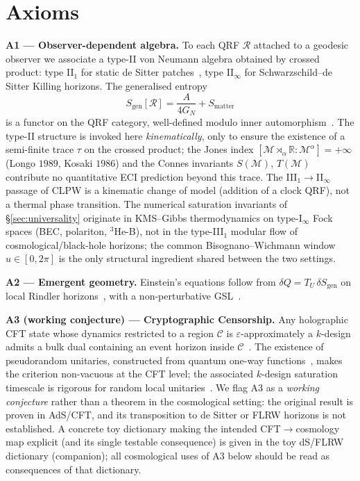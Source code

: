 \documentclass[reprint,amsmath,amssymb,aps,prd,superscriptaddress]{revtex4-2}
\providecommand{\1}{\mathbf{1}}
\begin{document}
\maketitle

\section{Axioms}

\noindent\textbf{A1 --- Observer-dependent algebra.}
To each QRF $\mathcal{R}$ attached to a geodesic observer we associate a type-II von Neumann algebra obtained by crossed product: type II$_1$ for static de Sitter patches~\cite{CLPW2023}, type II$_\infty$ for Schwarzschild--de Sitter Killing horizons. The generalised entropy
\begin{equation}
S_{\mathrm{gen}}[\mathcal{R}] = \frac{A}{4 G_N} + S_{\mathrm{matter}}
\end{equation}
is a functor on the QRF category, well-defined modulo inner automorphism~\cite{DEHK2025a,DEHK2025b,TiettoVerlinde2025}. The type-II structure is invoked here \emph{kinematically}, only to ensure the existence of a semi-finite trace $\tau$ on the crossed product; the Jones index $[\mathcal{M}\rtimes_\alpha\mathbb{R}:\mathcal{M}^\alpha]=+\infty$ (Longo $1989$, Kosaki $1986$) and the Connes invariants $S(\mathcal{M})$, $T(\mathcal{M})$ contribute no quantitative ECI prediction beyond this trace. The III$_1\!\to$II$_\infty$ passage of CLPW is a kinematic change of model (addition of a clock QRF), not a thermal phase transition. The numerical saturation invariants of \S\ref{sec:universality} originate in KMS--Gibbs thermodynamics on type-I$_\infty$ Fock spaces (BEC, polariton, $^3$He-B), not in the type-III$_1$ modular flow of cosmological/black-hole horizons; the common Bisognano--Wichmann window $u\in[0,2\pi]$ is the only structural ingredient shared between the two settings.

\smallskip
\noindent\textbf{A2 --- Emergent geometry.}
Einstein's equations follow from $\delta Q = T_U \, \delta S_{\mathrm{gen}}$ on local Rindler horizons~\cite{Jacobson1995}, with a non-perturbative GSL~\cite{FaulknerSperanza2024,Kirklin2025}.

\smallskip
\noindent\textbf{A3 (working conjecture) --- Cryptographic Censorship.}
Any holographic CFT state whose dynamics restricted to a region $\mathcal{C}$ is $\varepsilon$-approximately a $k$-design admits a bulk dual containing an event horizon inside $\mathcal{C}$~\cite{CryptoCensorship}. The existence of pseudorandom unitaries, constructed from quantum one-way functions~\cite{MaHuang2025}, makes the criterion non-vacuous at the CFT level; the associated $k$-design saturation timescale is rigorous for random local unitaries~\cite{Haferkamp2022}. We flag A3 as a \emph{working conjecture} rather than a theorem in the cosmological setting: the original result is proven in AdS/CFT, and its transposition to de Sitter or FLRW horizons is not established. A concrete toy dictionary making the intended CFT$\to$cosmology map explicit (and its single testable consequence) is given in the toy dS/FLRW dictionary (companion); all cosmological uses of A3 below should be read as consequences of that dictionary.
\end{document}
